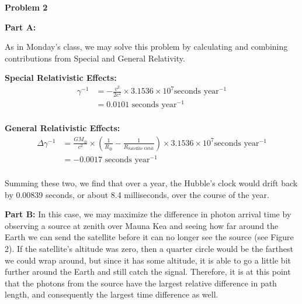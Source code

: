 \documentclass[12pt]{article}
\begin{document}
\begin{onehalfspacing}

\raggedright{\textbf{\Large Problem 2}}\\
\raggedright{\textbf{\large Part A: }}

As in Monday's class, we may solve this problem by calculating and combining contributions from Special and General Relativity.

\bigskip

\textbf{Special Relativistic Effects:}
\begin{align*}
  \gamma^{-1} &= - \frac{v^2}{2 c^2} \times 3.1536 \times 10^7 \text{seconds year$^{-1}$}\\
              &= 0.0101 \text{ seconds year$^{-1}$}\\
\end{align*}


\textbf{General Relativistic Effects:}
\begin{align*}
  \Delta \gamma^{-1} &= \frac{G M_{\oplus}}{c^2} \times \left( \frac{1}{R_{\oplus}} - \frac{1}{R_{\text{Satellite Orbit}}} \right)  \times 3.1536 \times 10^7 \text{seconds year$^{-1}$}\\
                     &= -0.0017  \text{ seconds year$^{-1}$} \\
\end{align*}


Summing these two, we find that over a year, the Hubble's clock would drift back by 0.00839 seconds, or about 8.4 milliseconds, over the course of the year.

\bigskip
\bigskip

\raggedright{\textbf{\large Part B: }}
In this case, we may maximize the difference in photon arrival time by observing a source at zenith over Mauna Kea and seeing how far around the Earth we can send the satellite before it can no longer see the source (see Figure 2). If the satellite's altitude was zero, then a quarter circle would be the farthest we could wrap around, but since it has some altitude, it is able to go a little bit further around the Earth and still catch the signal. Therefore, it is at this point that the photons from the source have the largest relative difference in path length, and consequently the largest time difference as well. \bigskip


\end{onehalfspacing}
\end{document}
